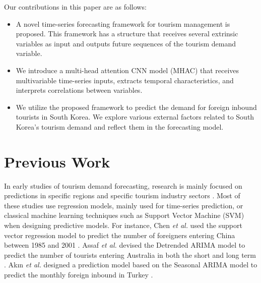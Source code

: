 \documentclass[conference]{IEEEtran}
\begin{document}
Our contributions in this paper are as follows:
\begin{itemize}
  \item A novel time-series forecasting framework for tourism management is proposed. This framework has a structure that receives several extrinsic variables as input and outputs future sequences of the tourism demand variable.
  \item We introduce a multi-head attention CNN model (MHAC) that receives multivariable time-series inputs, extracts temporal characteristics, and interprets correlations between variables.
  \item We utilize the proposed framework to predict the demand for foreign inbound tourists in South Korea. We explore various external factors related to South Korea's tourism demand and reflect them in the forecasting model.
\end{itemize}

\section{Previous Work}

In early studies of tourism demand forecasting, research is mainly focused on predictions in specific regions and specific tourism industry sectors \cite{george2011persistence, geurts1975comparing, pattie1996using, garcia1997note, chan1993forecasting, dharmaratne1995forecasting}. Most of these studies use regression models, mainly used for time-series prediction, or classical machine learning techniques such as Support Vector Machine (SVM) \cite{hearst1998support} when designing predictive models. For instance, Chen \textit{et al.} used the support vector regression model to predict the number of foreigners entering China between 1985 and 2001 \cite{chen2007support}. Assaf \textit{et al.} devised the Detrended ARIMA model to predict the number of tourists entering Australia in both the short and long term \cite{george2011persistence}. Akın \textit{et al.} designed a prediction model based on the Seasonal ARIMA model to predict the monthly foreign inbound in Turkey \cite{akin2015novel}. 
\end{document}
